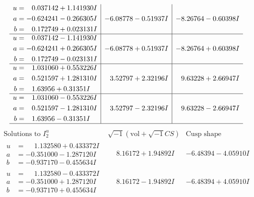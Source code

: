 \documentclass[1p]{elsarticle_modified}
\theoremstyle{definition}
\newcommand{\I}{\sqrt{-1}}
\begin{document}
$$\begin{array}{c|c|c}
\begin{aligned}
u &= \phantom{-}0.037142 + 1.141930 I \\
a &= -0.624241 - 0.266305 I \\
b &= \phantom{-}0.172749 + 0.023131 I\end{aligned}
 & -6.08778 - 0.51937 I & -8.26764 - 0.60398 I \\ \hline\begin{aligned}
u &= \phantom{-}0.037142 - 1.141930 I \\
a &= -0.624241 + 0.266305 I \\
b &= \phantom{-}0.172749 - 0.023131 I\end{aligned}
 & -6.08778 + 0.51937 I & -8.26764 + 0.60398 I \\ \hline\begin{aligned}
u &= \phantom{-}1.031060 + 0.553226 I \\
a &= \phantom{-}0.521597 + 1.281310 I \\
b &= \phantom{-}1.63956 + 0.31351 I\end{aligned}
 & \phantom{-}3.52797 + 2.32196 I & \phantom{-}9.63228 + 2.66947 I \\ \hline\begin{aligned}
u &= \phantom{-}1.031060 - 0.553226 I \\
a &= \phantom{-}0.521597 - 1.281310 I \\
b &= \phantom{-}1.63956 - 0.31351 I\end{aligned}
 & \phantom{-}3.52797 - 2.32196 I & \phantom{-}9.63228 - 2.66947 I\\
 \hline 
 \end{array}$$\newpage$$\begin{array}{c|c|c}  
\text{Solutions to }I^u_{2}& \I (\text{vol} + \sqrt{-1}CS) & \text{Cusp shape}\\
 \hline 
\begin{aligned}
u &= \phantom{-}1.132580 + 0.433372 I \\
a &= -0.351000 - 1.287120 I \\
b &= -0.937170 - 0.455634 I\end{aligned}
 & \phantom{-}8.16172 + 1.94892 I & -6.48394 - 4.05910 I \\ \hline\begin{aligned}
u &= \phantom{-}1.132580 - 0.433372 I \\
a &= -0.351000 + 1.287120 I \\
b &= -0.937170 + 0.455634 I\end{aligned}
 & \phantom{-}8.16172 - 1.94892 I & -6.48394 + 4.05910 I \\ \hline\begin{aligned}

\end{aligned}
\end{array}$$
\end{document}
